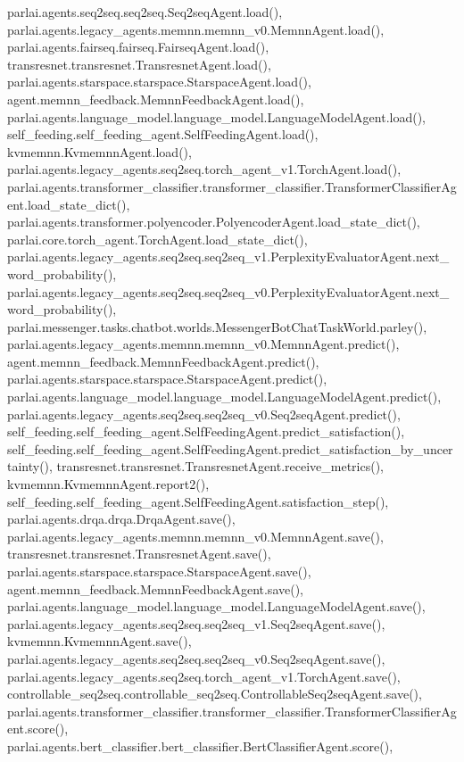 parlai.\+agents.\+seq2seq.\+seq2seq.\+Seq2seq\+Agent.\+load(), parlai.\+agents.\+legacy\+\_\+agents.\+memnn.\+memnn\+\_\+v0.\+Memnn\+Agent.\+load(), parlai.\+agents.\+fairseq.\+fairseq.\+Fairseq\+Agent.\+load(), transresnet.\+transresnet.\+Transresnet\+Agent.\+load(), parlai.\+agents.\+starspace.\+starspace.\+Starspace\+Agent.\+load(), agent.\+memnn\+\_\+feedback.\+Memnn\+Feedback\+Agent.\+load(), parlai.\+agents.\+language\+\_\+model.\+language\+\_\+model.\+Language\+Model\+Agent.\+load(), self\+\_\+feeding.\+self\+\_\+feeding\+\_\+agent.\+Self\+Feeding\+Agent.\+load(), kvmemnn.\+Kvmemnn\+Agent.\+load(), parlai.\+agents.\+legacy\+\_\+agents.\+seq2seq.\+torch\+\_\+agent\+\_\+v1.\+Torch\+Agent.\+load(), parlai.\+agents.\+transformer\+\_\+classifier.\+transformer\+\_\+classifier.\+Transformer\+Classifier\+Agent.\+load\+\_\+state\+\_\+dict(), parlai.\+agents.\+transformer.\+polyencoder.\+Polyencoder\+Agent.\+load\+\_\+state\+\_\+dict(), parlai.\+core.\+torch\+\_\+agent.\+Torch\+Agent.\+load\+\_\+state\+\_\+dict(), parlai.\+agents.\+legacy\+\_\+agents.\+seq2seq.\+seq2seq\+\_\+v1.\+Perplexity\+Evaluator\+Agent.\+next\+\_\+word\+\_\+probability(), parlai.\+agents.\+legacy\+\_\+agents.\+seq2seq.\+seq2seq\+\_\+v0.\+Perplexity\+Evaluator\+Agent.\+next\+\_\+word\+\_\+probability(), parlai.\+messenger.\+tasks.\+chatbot.\+worlds.\+Messenger\+Bot\+Chat\+Task\+World.\+parley(), parlai.\+agents.\+legacy\+\_\+agents.\+memnn.\+memnn\+\_\+v0.\+Memnn\+Agent.\+predict(), agent.\+memnn\+\_\+feedback.\+Memnn\+Feedback\+Agent.\+predict(), parlai.\+agents.\+starspace.\+starspace.\+Starspace\+Agent.\+predict(), parlai.\+agents.\+language\+\_\+model.\+language\+\_\+model.\+Language\+Model\+Agent.\+predict(), parlai.\+agents.\+legacy\+\_\+agents.\+seq2seq.\+seq2seq\+\_\+v0.\+Seq2seq\+Agent.\+predict(), self\+\_\+feeding.\+self\+\_\+feeding\+\_\+agent.\+Self\+Feeding\+Agent.\+predict\+\_\+satisfaction(), self\+\_\+feeding.\+self\+\_\+feeding\+\_\+agent.\+Self\+Feeding\+Agent.\+predict\+\_\+satisfaction\+\_\+by\+\_\+uncertainty(), transresnet.\+transresnet.\+Transresnet\+Agent.\+receive\+\_\+metrics(), kvmemnn.\+Kvmemnn\+Agent.\+report2(), self\+\_\+feeding.\+self\+\_\+feeding\+\_\+agent.\+Self\+Feeding\+Agent.\+satisfaction\+\_\+step(), parlai.\+agents.\+drqa.\+drqa.\+Drqa\+Agent.\+save(), parlai.\+agents.\+legacy\+\_\+agents.\+memnn.\+memnn\+\_\+v0.\+Memnn\+Agent.\+save(), transresnet.\+transresnet.\+Transresnet\+Agent.\+save(), parlai.\+agents.\+starspace.\+starspace.\+Starspace\+Agent.\+save(), agent.\+memnn\+\_\+feedback.\+Memnn\+Feedback\+Agent.\+save(), parlai.\+agents.\+language\+\_\+model.\+language\+\_\+model.\+Language\+Model\+Agent.\+save(), parlai.\+agents.\+legacy\+\_\+agents.\+seq2seq.\+seq2seq\+\_\+v1.\+Seq2seq\+Agent.\+save(), kvmemnn.\+Kvmemnn\+Agent.\+save(), parlai.\+agents.\+legacy\+\_\+agents.\+seq2seq.\+seq2seq\+\_\+v0.\+Seq2seq\+Agent.\+save(), parlai.\+agents.\+legacy\+\_\+agents.\+seq2seq.\+torch\+\_\+agent\+\_\+v1.\+Torch\+Agent.\+save(), controllable\+\_\+seq2seq.\+controllable\+\_\+seq2seq.\+Controllable\+Seq2seq\+Agent.\+save(), parlai.\+agents.\+transformer\+\_\+classifier.\+transformer\+\_\+classifier.\+Transformer\+Classifier\+Agent.\+score(), parlai.\+agents.\+bert\+\_\+classifier.\+bert\+\_\+classifier.\+Bert\+Classifier\+Agent.\+score(), 